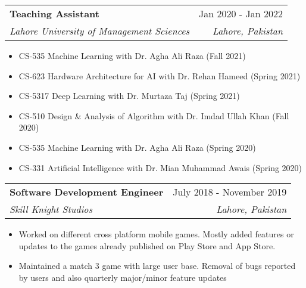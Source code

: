 \documentclass[letterpaper,11pt]{article}
\makeatletter
\newcommand{\resumeItem}[1]{
  \item\small{
    {#1 \vspace{-2pt}}
  }
}
\newcommand{\resumeSubheading}[4]{
  \vspace{-2pt}\item
    \begin{tabular*}{0.97\textwidth}[t]{l@{\extracolsep{\fill}}r}
      \textbf{#1} & #2 \\
      \textit{\small#3} & \textit{\small #4} \\
    \end{tabular*}\vspace{-7pt}
}
\newcommand{\resumeSubSubheading}[2]{
    \item
    \begin{tabular*}{0.97\textwidth}{l@{\extracolsep{\fill}}r}
      \textit{\small#1} & \textit{\small #2} \\
    \end{tabular*}\vspace{-7pt}
}
\newcommand{\resumeSubHeadingListEnd}{\end{itemize}}
\newcommand{\resumeItemListStart}{\begin{itemize}}
\newcommand{\resumeItemListEnd}{\end{itemize}\vspace{-5pt}}
\makeatother
\begin{document}
    \resumeSubheading
      {Teaching Assistant}{Jan 2020 - Jan 2022}
      {Lahore University of Management Sciences}{Lahore, Pakistan}
      \vspace{0.1cm}
      
      \resumeItemListStart
      Designed and graded assignments/quizzes for the following courses:
        \resumeItem{CS-535 Machine Learning with Dr. Agha Ali Raza (Fall 2021)}
        \resumeItem{CS-623 Hardware Architecture for AI with Dr. Rehan Hameed (Spring 2021)}
        \resumeItem{CS-5317 Deep Learning with Dr. Murtaza Taj (Spring 2021)}
        \resumeItem{CS-510 Design \& Analysis of Algorithm with Dr. Imdad Ullah Khan (Fall 2020)}
        \resumeItem{CS-535 Machine Learning with Dr. Agha Ali Raza (Spring 2020)}
        \resumeItem{CS-331 Artificial Intelligence with Dr. Mian Muhammad Awais (Spring 2020)}        
     \resumeItemListEnd      
      
      
    \resumeSubheading
      {Software Development Engineer}{July 2018 - November 2019}
      {Skill Knight Studios}{Lahore, Pakistan}
      \resumeItemListStart
        \resumeItem{Worked on different cross platform mobile games. Mostly added features or updates to the games already published on Play Store and App Store.}
        \resumeItem{Maintained a match 3 game with large user base. Removal of bugs reported by users and also quarterly major/minor feature updates}
\resumeItemListEnd
    


      


\end{document}
